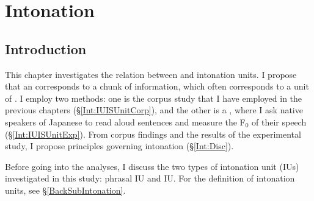 \chapter{Intonation}\label{Intonation}



\section{Introduction}\label{Int:PIUCIU}

This chapter investigates the relation between  and intonation units.
I propose that
an  corresponds to a chunk of information, which often corresponds to a unit of .
I employ two methods:
one is the corpus study that I have employed in the previous chapters (\S \ref{Int:IUISUnitCorp}),
and the other is a , where I ask native speakers of Japanese to read aloud sentences and measure the F$_{0}$ of their speech (\S \ref{Int:IUISUnitExp}).
From corpus findings and the results of the experimental study,
I propose principles governing intonation (\S \ref{Int:Disc}).


Before going into the analyses,
I discuss the two types of intonation unit (IUs) investigated in this study:
phrasal IU and  IU.
For the definition of intonation units,
see \S \ref{BackSubIntonation}.


